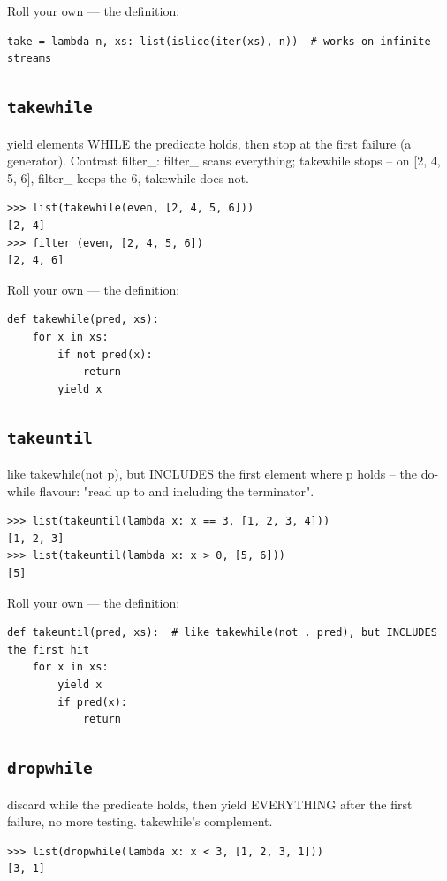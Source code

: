 \documentclass[10pt,letterpaper]{book}
\begin{document}
Roll your own --- the definition:

\begin{lstlisting}[style=ex]
take = lambda n, xs: list(islice(iter(xs), n))  # works on infinite streams
\end{lstlisting}

\subsection{\texttt{takewhile}}\label{def:takewhile}
yield elements WHILE the predicate holds, then stop at the first failure (a generator). Contrast filter\_: filter\_ scans everything; takewhile stops -- on [2, 4, 5, 6], filter\_ keeps the 6, takewhile does not.
\begin{lstlisting}[style=ex]
>>> list(takewhile(even, [2, 4, 5, 6]))
[2, 4]
>>> filter_(even, [2, 4, 5, 6])
[2, 4, 6]
\end{lstlisting}

Roll your own --- the definition:

\begin{lstlisting}[style=ex]
def takewhile(pred, xs):
    for x in xs:
        if not pred(x):
            return
        yield x
\end{lstlisting}
\subsection{\texttt{takeuntil}}\label{def:takeuntil}
like takewhile(not p), but INCLUDES the first element where p holds -- the do-while flavour: "read up to and including the terminator".
\begin{lstlisting}[style=ex]
>>> list(takeuntil(lambda x: x == 3, [1, 2, 3, 4]))
[1, 2, 3]
>>> list(takeuntil(lambda x: x > 0, [5, 6]))
[5]
\end{lstlisting}

Roll your own --- the definition:

\begin{lstlisting}[style=ex]
def takeuntil(pred, xs):  # like takewhile(not . pred), but INCLUDES the first hit
    for x in xs:
        yield x
        if pred(x):
            return
\end{lstlisting}
\subsection{\texttt{dropwhile}}\label{def:dropwhile}
discard while the predicate holds, then yield EVERYTHING after the first failure, no more testing. takewhile's complement.
\begin{lstlisting}[style=ex]
>>> list(dropwhile(lambda x: x < 3, [1, 2, 3, 1]))
[3, 1]
\end{lstlisting}
\end{document}
